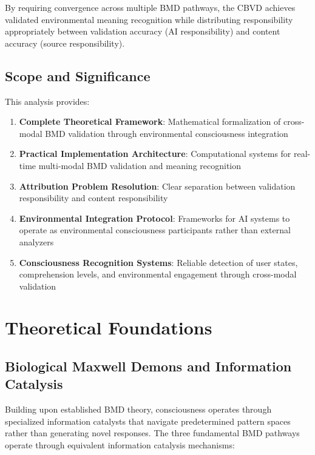 \documentclass[12pt,a4paper]{article}
\begin{document}
By requiring convergence across multiple BMD pathways, the CBVD achieves validated environmental meaning recognition while distributing responsibility appropriately between validation accuracy (AI responsibility) and content accuracy (source responsibility).

\subsection{Scope and Significance}

This analysis provides:

\begin{enumerate}
\item \textbf{Complete Theoretical Framework}: Mathematical formalization of cross-modal BMD validation through environmental consciousness integration
\item \textbf{Practical Implementation Architecture}: Computational systems for real-time multi-modal BMD validation and meaning recognition
\item \textbf{Attribution Problem Resolution}: Clear separation between validation responsibility and content responsibility
\item \textbf{Environmental Integration Protocol}: Frameworks for AI systems to operate as environmental consciousness participants rather than external analyzers
\item \textbf{Consciousness Recognition Systems}: Reliable detection of user states, comprehension levels, and environmental engagement through cross-modal validation
\end{enumerate}

\section{Theoretical Foundations}

\subsection{Biological Maxwell Demons and Information Catalysis}

Building upon established BMD theory, consciousness operates through specialized information catalysts that navigate predetermined pattern spaces rather than generating novel responses. The three fundamental BMD pathways operate through equivalent information catalysis mechanisms:
\end{document}
